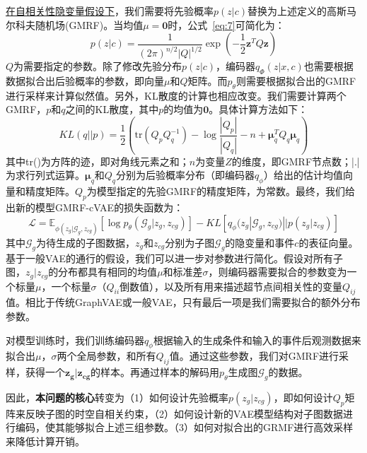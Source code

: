 \documentclass[12pt,UTF8,AutoFakeBold=2,a4paper]{ctexart} %
\begin{document}
\underline{在自相关性隐变量假设下}，我们需要将先验概率$p(z|c)$替换为上述定义的高斯马尔科夫随机场(GMRF)。当均值$\mu=\mathbf{0}$时，公式~\ref{eq:7}可简化为：
\begin{equation}
    p(z|c) = \frac{1}{(2\pi)^{n/2} |Q|^{1/2}} \exp\left(-\frac{1}{2} \mathbf{z}^T Q \mathbf{z} \right)
        \label{eq:pz}
\end{equation}
$Q$为需要指定的参数。除了修改先验分布$p(z|c)$，编码器$q_\Phi(z|x,c)$也需要根据数据拟合出后验概率的参数，即向量$\mathbb{\mu}$和$Q$矩阵。而$p_\theta$则需要根据拟合出的GMRF进行采样来计算似然值。另外，KL散度的计算也相应改变。我们需要计算两个GMRF，$p$和$q$之间的KL散度，其中$p$的均值为$\mathbf{0}$。具体计算方法如下：
\begin{equation}
    {KL}(q || p) = \frac{1}{2} \left( \text{tr}(Q_p Q_q^{-1}) - \log \frac{|Q_p|}{|Q_q|} - n + \boldsymbol{\mu}_q^T Q_q \boldsymbol{\mu}_q \right)
    \label{eq:kl}
\end{equation}
其中tr()为方阵的迹，即对角线元素之和；$n$为变量$Z$的维度，即GMRF节点数；|.|为求行列式运算。$\boldsymbol{\mu}_q$和$Q_q$分别为后验概率分布（即编码器$q_{\phi}$）给出的估计均值向量和精度矩阵。$Q_p$为模型指定的先验GMRF的精度矩阵，为常数。最终，我们给出新的模型GMRF-cVAE的损失函数为：
\begin{equation}
    \mathcal{L} = \mathbb{E}_{\phi(z_g|\mathcal{G}_g,z_{cg})}[\log p_\theta(\mathcal{G}_g|z_g,z_{cg})]-KL[q_\phi(z_g|\mathcal{G}_g,z_{cg})||p(z_g|z_{cg})]
    \label{eq:gmrf_loss}
\end{equation}
其中$\mathcal{G}_g$为待生成的子图数据，$z_g$和$z_{cg}$分别为子图$\mathcal{G}_g$的隐变量和事件$c$的表征向量。
基于一般VAE的通行的假设，我们可以进一步对参数进行简化。假设对所有子图，$z_g|z_{cg}$的分布都具有相同的均值$\mu$和标准差$\sigma$，则编码器需要拟合的参数变为一个标量$\mu$，一个标量$\sigma$（$Q_{ii}$倒数值），以及所有用来描述超节点间相关性的变量$Q_{ij}$值。相比于传统GraphVAE或一般VAE，只有最后一项是我们需要拟合的额外分布参数。

对模型训练时，我们训练编码器$q_\phi$根据输入的生成条件和输入的事件后观测数据来拟合出${\mu}$，$\sigma$两个全局参数，和所有$Q_{ij}$值。通过这些参数，我们对GMRF进行采样，获得一个$\mathbf{z_g|z_{cg}}$的样本。再通过样本的解码用$p_\theta$生成图$\mathcal{G}_g$的数据。

因此，\textbf{本问题的核心}转变为（1）如何设计先验概率$p(z_g|z_{cg})$，即如何设计$Q_p$矩阵来反映子图的时空自相关约束，（2）如何设计新的VAE模型结构对子图数据进行编码，使其能够拟合上述三组参数。（3）如何对拟合出的GRMF进行高效采样来降低计算开销。
\end{document}
